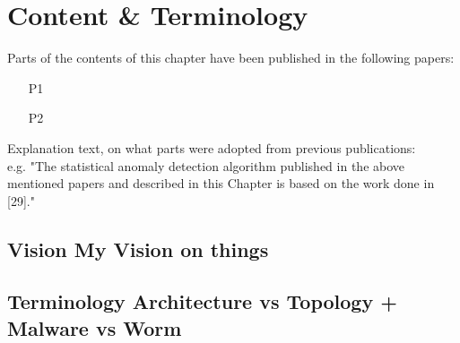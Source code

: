 \section{Content \& Terminology} \label{sec:content}

\begin{Prev.Publ}
	Parts of the contents of this chapter have been published in the following papers:
	\begin{enumerate}
		\item [\lbrack P1\rbrack]  %
		\item [\lbrack P2\rbrack] 
	\end{enumerate}
	
	Explanation text, on what parts were adopted from previous publications:\\
	e.g. "The statistical anomaly detection algorithm published in the above mentioned papers and described in this
	Chapter is based on the work done in [29]."	
\end{Prev.Publ}


\subsection{Vision \tiny{My Vision on things}} \label{subsec.vision}


\subsection{Terminology    \tiny{Architecture vs Topology + Malware vs Worm}  } \label{subsec.terminology}



\newpage
